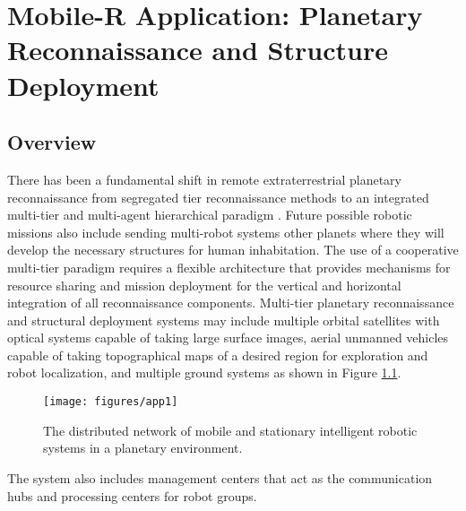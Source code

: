 \chapter{Mobile-R Application: Planetary Reconnaissance and Structure
         Deployment}

  \section{Overview}
    There has been a fundamental shift in remote extraterrestrial planetary 
      reconnaissance from segregated tier reconnaissance methods to an 
      integrated multi-tier and multi-agent hierarchical paradigm 
      \cite{Fink2005}.
    Future possible robotic missions also include sending multi-robot systems 
      other planets where they will develop the necessary structures for
      human inhabitation.
    The use of a cooperative multi-tier paradigm requires a flexible 
      architecture that provides mechanisms for resource sharing and mission
      deployment for the vertical and horizontal integration of all 
      reconnaissance components.
    Multi-tier planetary reconnaissance and structural deployment systems may
      include multiple orbital satellites with optical systems capable of taking 
      large surface images, aerial unmanned vehicles capable of taking 
      topographical maps of a desired region for exploration and robot 
      localization, and multiple ground systems as shown in Figure 
      \ref{fig:app1}.
    \begin{figure}%
    \centerline{\texttt{[image: figures/app1]}}
       \caption{The distributed network of mobile and stationary intelligent 
       robotic systems in a planetary environment.}
       \label{fig:app1}
    \end{figure}
    The system also includes management centers that act as the communication
      hubs and processing centers for robot groups.

